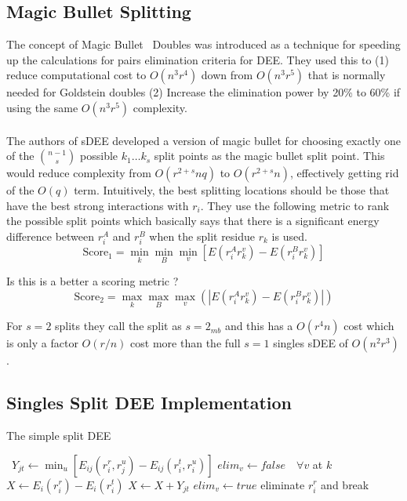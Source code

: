 \documentclass{article}
\begin{document}
\subsection{Magic Bullet Splitting}
The concept of Magic Bullet~\cite{Gordon1998} Doubles was introduced as a technique for speeding up the calculations for pairs elimination criteria for DEE. They used this to (1) reduce computational cost to $O(n^3r^4)$ down from $O(n^3r^5)$ that is normally needed for Goldstein doubles (2) Increase the elimination power by 20\% to 60\% if using the same $O(n^3r^5)$ complexity. 
\\
\\
The authors of sDEE developed a version of magic bullet for choosing exactly one of the $n-1 \choose s$ possible $k_1\dots k_s$ split points as the magic bullet split point. This would reduce complexity from $O(r^{2+s}nq)$ to $O(r^{2+s}n)$, effectively getting rid of the $O(q)$ term. Intuitively, the best splitting locations should be those that have the best strong interactions with $r_i$. They use the following metric to rank the possible split points which basically says that there is a significant energy difference between $r_i^A$ and $r_i^B$ when the split residue $r_k$ is used. 
\[
\text{Score}_1 = \min_k \min_B \min_v[E(r_i^Ar_k^v) - E(r_i^Br_k^v)]
\]

Is this is a better a scoring metric ? 
\[
\text{Score}_2 = \max_k \max_B \max_v \left( \left| E(r_i^Ar_k^v) - E(r_i^Br_k^v) \right| \right)
\]

For $s=2$ splits they call the split as $s=2_{mb}$ and this has a $O(r^4n)$ cost which is only a factor $O(r/n)$ cost more than the full $s=1$ singles sDEE of $O(n^2r^3)$. 

\subsection{Singles Split DEE Implementation}

\begin{algorithm}
\caption{The simple split DEE} \label{algo:sDEE}
\begin{algorithmic}
				\
					\State $Y_{jt} \gets \min_u\left[E_{ij}(r_i^r,r_j^u) - E_{ij}(r_i^t,r_i^u)\right]$
				\EndFor
			\EndFor
		\EndFor
			\State $elim_v \gets false \quad \forall v$ at $k$
				\State $X \gets E_i(r_i^r) - E_i(r_i^t)$
					\State $X \gets X + Y_{jt}$
				\EndFor
						\State $elim_v \gets true$						
					\EndIf
				\EndFor
			\EndFor
				\State eliminate $r_i^r$ and break
			\EndIf
		\EndFor
	\EndFor
\EndFor
\end{algorithmic}
\end{algorithm}
\end{document}
